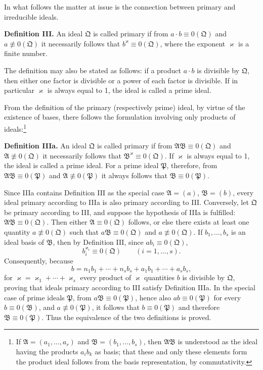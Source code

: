 \documentclass[11pt]{article}
\newcommand{\ideal}[1]{\mathfrak{#1}}
\begin{document}
In what follows the matter at issue is the connection between primary and irreducible ideals.

\textbf{Definition III.} An ideal $\ideal Q$ is called primary if from $a\cdot b\equiv0(\ideal Q)$ and $a\not\equiv0(\ideal Q)$ it necessarily follows that $b^\varkappa\equiv0(\ideal Q)$, where the exponent $\varkappa$ is a finite number.

The definition may also be stated as follows: if a product $a\cdot b$ is divisible by $\ideal Q$, then either one factor is divisible or a power of each factor is divisible. If in particular $\varkappa$ is always equal to 1, the ideal is called a prime ideal.

From the definition of the primary (respectively prime) ideal, by virtue of the existence of bases, there follows the formulation involving only products of ideals:\footnote{If $\ideal A=(a_1,\ldots,a_r)$ and $\ideal B=(b_1,\ldots,b_s)$, then $\ideal A\ideal B$ is understood as the ideal having the products $a_i b_k$ as basis; that these and only these elements form the product ideal follows from the basis representation, by commutativity.}

\textbf{Definition IIIa.} An ideal $\ideal Q$ is called primary if from $\ideal A\ideal B\equiv0(\ideal Q)$ and $\ideal A\not\equiv0(\ideal Q)$ it necessarily follows that $\ideal B^\varkappa\equiv0(\ideal Q)$. If $\varkappa$ is always equal to 1, the ideal is called a prime ideal. For a prime ideal $\ideal P$, therefore, from $\ideal A\ideal B\equiv0(\ideal P)$ and $\ideal A\not\equiv0(\ideal P)$ it always follows that $\ideal B\equiv0(\ideal P)$.

Since IIIa contains Definition III as the special case $\ideal A=(a)$, $\ideal B=(b)$, every ideal primary according to IIIa is also primary according to III. Conversely, let $\ideal Q$ be primary according to III, and suppose the hypothesis of IIIa is fulfilled: $\ideal A\ideal B\equiv0(\ideal Q)$. Then either $\ideal A\equiv0(\ideal Q)$ follows, or else there exists at least one quantity $a\not\equiv0(\ideal Q)$ such that $a\ideal B\equiv0(\ideal Q)$ and $a\not\equiv0(\ideal Q)$. If $b_1,
\ldots,b_s$ is an ideal basis of $\ideal B$, then by Definition III, since $ab_i\equiv0(\ideal Q)$,
\[
 b_i^{\varkappa_i}\equiv0(\ideal Q)\qquad (i=1,\ldots,s).
\]
Consequently, because
\[
 b=n_1b_1+\cdots+n_sb_s+a_1b_1+\cdots+a_sb_s,
\]
for $\varkappa=\varkappa_1+\cdots+\varkappa_s$ every product of $\varkappa$ quantities $b$ is divisible by $\ideal Q$, proving that ideals primary according to III satisfy Definition IIIa. In the special case of prime ideals $\ideal P$, from $a\ideal B\equiv0(\ideal P)$, hence also $ab\equiv0(\ideal P)$ for every $b\equiv0(\ideal B)$, and $a\not\equiv0(\ideal P)$, it follows that $b\equiv0(\ideal P)$ and therefore $\ideal B\equiv0(\ideal P)$. Thus the equivalence of the two definitions is proved.
\end{document}
